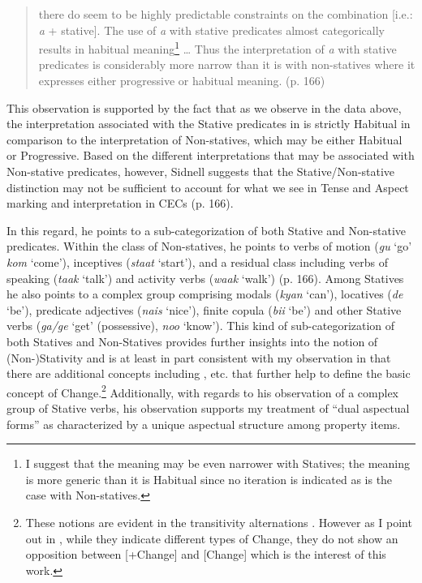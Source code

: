 \begin{quote}
there do seem to be highly predictable constraints on the combination
[i.e.: \textit{a} + stative]. The use of \textit{a} with stative
predicates almost categorically results in habitual meaning\footnote{I
  suggest that the meaning may be even narrower with Statives; the
  meaning is more generic than it is Habitual since no iteration is
  indicated as is the case with Non-statives.} … Thus the interpretation
of \textit{a} with stative predicates is considerably more narrow than
it is with non-statives where it expresses either progressive or
habitual meaning. (p. 166)
\end{quote}

This observation is supported by the fact that as we observe in the
data above, the interpretation associated with the Stative predicates
in  is strictly Habitual in comparison to the interpretation of
Non-statives, which may be either Habitual or Progressive.  Based on
the different interpretations that may be associated with Non-stative
predicates, however, Sidnell suggests that the Stative\slash Non-stative
distinction may not be sufficient to account for what we see in Tense
and Aspect marking and interpretation in CECs (p. 166).

In this regard, he points to a sub-categorization of both Stative and
Non-stative predicates.  Within the class of Non-statives, he points to
verbs of motion (\textit{gu} `go' \textit{kom} `come'), inceptives
(\textit{staat} `start'), and a residual class including verbs of
speaking (\textit{taak} `talk') and activity verbs (\textit{waak}
`walk') (p. 166).  Among Statives he also points to a complex group
comprising modals (\textit{kyan} `can'), locatives (\textit{de} `be'),
predicate adjectives (\textit{nais} `nice'), finite copula
(\textit{bii} `be') and other Stative verbs (\textit{ga/ge} `get'
(possessive), \textit{noo} `know').  This kind of sub-categorization
of both Statives and Non-Statives provides further insights into the
notion of \mbox{(Non-)}Stativity and is at least in part consistent with my
observation in  that there are additional concepts
including \MOTION, \CONTACT etc. that further help to define the basic
concept of Change.\footnote{These notions are evident in the
  transitivity alternations \citep{Levin1993}.  However as I point out
  in , while they indicate different types of Change, they
  do not show an opposition between [+Change] and [\textminus Change] which is
  the interest of this work.}  Additionally, with regards to his
observation of a complex group of Stative verbs, his observation
supports my treatment of ``dual aspectual forms'' as characterized by a
unique aspectual structure among property items.

